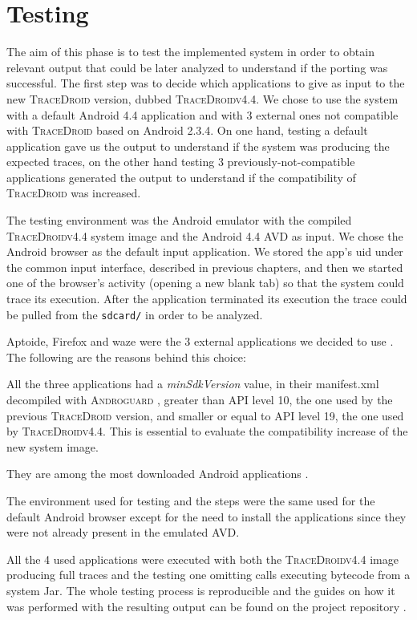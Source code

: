 \section{Testing}
\label{sec:eval_benchmarks}

The aim of this phase is to test the implemented system in order to
obtain relevant output that could be later analyzed to understand if
the porting was successful. The first step was to decide which
applications to give as input to the new \textsc{TraceDroid} version, dubbed \textsc{TraceDroidv4.4}. We chose
to use the system with a default Android 4.4 application and with 3
external ones not compatible with \textsc{TraceDroid} based on Android
2.3.4. On one hand, testing a default application gave us the output
to understand if the system was producing the expected traces, on the
other hand testing 3 previously-not-compatible applications generated the
output to understand if the compatibility of \textsc{TraceDroid} was increased.

The testing environment was the Android emulator with the compiled
\textsc{TraceDroidv4.4} system image and the Android 4.4 AVD as input. We chose
the Android browser as the default input application. We stored the
app's uid under the common input interface, described in previous
chapters, and then we started one of the browser's activity (opening a
new blank tab) so that the system could trace its execution. After the
application terminated its execution the trace could be pulled from
the \texttt{sdcard/} in order to be analyzed.

Aptoide, Firefox and waze were the 3 external applications we decided
to use \cite{ref23, ref24, ref25}. The following are the reasons behind this choice:
\begin{enumerate*}
  \item All the three applications had a \textit{minSdkVersion} value, in their
    manifest.xml decompiled with \textsc{Androguard} \cite{ref12}, greater
    than API level 10, the one used by the previous
    \textsc{TraceDroid} version, and smaller or equal to API level 19,
    the one used by \textsc{TraceDroidv4.4}. This is
    essential to evaluate the compatibility increase of the new system
    image.
  \item They are among the most downloaded Android applications \cite{ref26, ref27}.
\end{enumerate*}
The environment used for testing and the steps were the same used for
the default Android browser except for the need to install the
applications since they were not already present in the emulated AVD.

All the 4 used applications were executed with both the \textsc{TraceDroidv4.4}
image producing full traces and the testing one omitting
calls executing bytecode from a system Jar. The whole testing process
is reproducible and the guides on how it was performed with the
resulting output can be found on the project repository \cite{ref15}.
